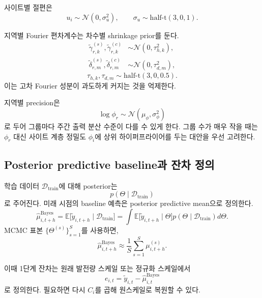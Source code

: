 \documentclass[11pt,a4paper]{article}
\begin{document}
사이트별 절편은
\begin{equation}
    u_i \sim \mathcal N(0,\sigma_u^2), \qquad \sigma_u \sim \mathrm{half\mbox{-}t}(3,0,1).
\end{equation}

지역별 Fourier 편차계수는 차수별 shrinkage prior를 둔다.
\begin{align}
    \tilde\gamma_{r,k}^{(s)},\tilde\gamma_{r,k}^{(c)} &\sim \mathcal N(0, \tau_{h,k}^2), \\
    \tilde\delta_{r,m}^{(s)},\tilde\delta_{r,m}^{(c)} &\sim \mathcal N(0, \tau_{d,m}^2),
\end{align}
\begin{equation}
    \tau_{h,k},\tau_{d,m} \sim \mathrm{half\mbox{-}t}(3,0,0.5).
\end{equation}
이는 고차 Fourier 성분이 과도하게 커지는 것을 억제한다.

지역별 precision은
\begin{equation}
    \log \phi_r \sim \mathcal N(\mu_\phi,\sigma_\phi^2)
\end{equation}
로 두어 그룹마다 주간 출력 분산 수준이 다를 수 있게 한다. 그룹 수가 매우 작을 때는 $\phi_r$ 대신 사이트 계층 정밀도 $\phi_i$에 상위 하이퍼프라이어를 두는 대안을 우선 고려한다.

\subsection{Posterior predictive baseline과 잔차 정의}
학습 데이터 $\mathcal D_{\mathrm{train}}$에 대해 posterior는
\begin{equation}
    p(\Theta \mid \mathcal D_{\mathrm{train}})
\end{equation}
로 주어진다. 미래 시점의 baseline 예측은 posterior predictive mean으로 정의한다.
\begin{equation}
    \hat \mu^{\mathrm{Bayes}}_{i,t+h}
    = \mathbb E\bigl[\tilde y_{i,t+h}\mid \mathcal D_{\mathrm{train}}\bigr]
    = \int \mathbb E\bigl[\tilde y_{i,t+h}\mid \Theta\bigr] p(\Theta\mid\mathcal D_{\mathrm{train}}) d\Theta.
\end{equation}
MCMC 표본 $\{\Theta^{(s)}\}_{s=1}^S$를 사용하면,
\begin{equation}
    \hat \mu^{\mathrm{Bayes}}_{i,t+h} \approx \frac{1}{S} \sum_{s=1}^S \mu_{i,t+h}^{(s)}.
    \label{eq:posterior_mean}
\end{equation}

이때 1단계 잔차는 원래 발전량 스케일 또는 정규화 스케일에서
\begin{equation}
    e_{i,t} = \tilde y_{i,t} - \hat \mu^{\mathrm{Bayes}}_{i,t}
\end{equation}
로 정의한다. 필요하면 다시 $C_i$를 곱해 원스케일로 복원할 수 있다.
\end{document}

